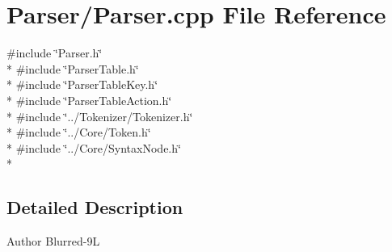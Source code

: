 \section{Parser/\-Parser.cpp File Reference}
\label{_parser_8cpp}
{\ttfamily \#include \char`\"{}Parser.\-h\char`\"{}}\\*
{\ttfamily \#include \char`\"{}Parser\-Table.\-h\char`\"{}}\\*
{\ttfamily \#include \char`\"{}Parser\-Table\-Key.\-h\char`\"{}}\\*
{\ttfamily \#include \char`\"{}Parser\-Table\-Action.\-h\char`\"{}}\\*
{\ttfamily \#include \char`\"{}../\-Tokenizer/\-Tokenizer.\-h\char`\"{}}\\*
{\ttfamily \#include \char`\"{}../\-Core/\-Token.\-h\char`\"{}}\\*
{\ttfamily \#include \char`\"{}../\-Core/\-Syntax\-Node.\-h\char`\"{}}\\*


\subsection{Detailed Description}
\begin{DoxyAuthor}{Author}
Blurred-\/9\-L 
\end{DoxyAuthor}
